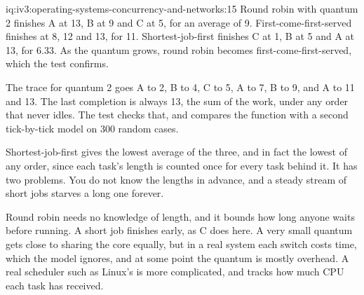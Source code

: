 \begin{solution}{iq:iv3:operating-systems-concurrency-and-networks:15}
Round robin with quantum 2 finishes A at 13, B at 9 and C at 5, for an average of 9. First-come-first-served finishes at 8, 12 and 13, for 11. Shortest-job-first finishes C at 1, B at 5 and A at 13, for 6.33. As the quantum grows, round robin becomes first-come-first-served, which the test confirms.
\label{lst:iv3:os:rr}

The trace for quantum 2 goes A to 2, B to 4, C to 5, A to 7, B to 9, and A to 11 and 13. The last completion is always 13, the sum of the work, under any order that never idles. The test checks that, and compares the function with a second tick-by-tick model on 300 random cases.

Shortest-job-first gives the lowest average of the three, and in fact the lowest of any order, since each task's length is counted once for every task behind it. It has two problems. You do not know the lengths in advance, and a steady stream of short jobs starves a long one forever.

Round robin needs no knowledge of length, and it bounds how long anyone waits before running. A short job finishes early, as C does here. A very small quantum gets close to sharing the core equally, but in a real system each switch costs time, which the model ignores, and at some point the quantum is mostly overhead. A real scheduler such as Linux's is more complicated, and tracks how much CPU each task has received.

\end{solution}

